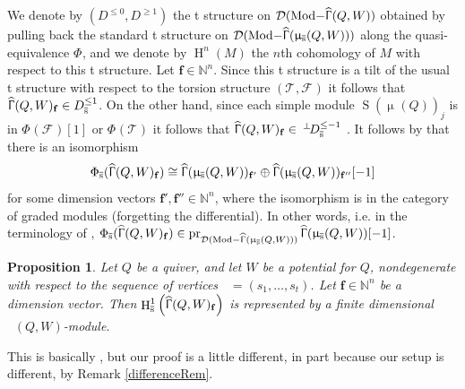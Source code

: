\documentclass[a4paper,10pt]{amsart}
\newtheorem{proposition}[theorem]{Proposition}
\newcommand{\ff}{\mathbf{f}}
\DeclareMathOperator{\Simp}{S}
\renewcommand{\Gamma}{\Upgamma}
\renewcommand{\mu}{\upmu}
\DeclareMathOperator{\Tmod}{Mod-}
\newcommand{\Rmod}[1]{\Tmod\!#1}
\DeclareMathOperator{\HJac}{\widehat{Jac}}
\DeclareMathOperator{\HGamma}{\widehat{\Gamma}}
\DeclareMathOperator{\Ss}{\overline{s}}
\DeclareMathOperator{\HO}{H}
\newcommand{\Dub}{\mathcal{D}}
\begin{document}
We denote by $(D_{\Ss}^{\leq 0},D_{\Ss}^{\geq 1})$ the t structure on $\Dub(\Rmod{\HGamma(Q,W)})$ obtained by pulling back the standard t structure on $\Dub(\Rmod{\HGamma(\mu_{\Ss}(Q,W))})$ along the quasi-equivalence $\Phi_{\Ss}$, and we denote by $\HO_{\Ss}^n(M)$ the $n$th cohomology of $M$ with respect to this t structure.  Let $\ff\in\mathbb{N}^n$.  Since this t structure is a tilt of the usual t structure with respect to the torsion structure $(\mathcal{T}_{\Ss},\mathcal{F}_{\Ss})$ it follows that $\HGamma(Q,W)_{\ff}\in D_{\Ss}^{\leq 1}$.  On the other hand, since each simple module $\Simp(\mu_{\Ss}(Q))_{j}$ is in $\Phi_{\Ss}(\mathcal{F}_{\Ss})[1]$ or $\Phi_{\Ss}(\mathcal{T}_{\Ss})$ it follows that $\HGamma(Q,W)_{\ff}\in \:^\perp \!D_{\Ss}^{\leq -1}$ .  It follows by \cite[Lem.2.11]{Pl11} that there is an isomorphism
\begin{equation}
\label{PlamIso}
\Phi_{\Ss}(\HGamma(Q,W)_{\ff})\cong\HGamma(\mu_{\Ss}(Q,W))_{\ff'}\oplus \HGamma(\mu_{\Ss}(Q,W))_{\ff''}[-1]
\end{equation}
for some dimension vectors $\ff',\ff''\in\mathbb{N}^n$, where the isomorphism is in the category of graded modules (forgetting the differential).  In other words, i.e. in the terminology of \cite{Pl11}, $\Phi_{\Ss}(\HGamma(Q,W)_{\ff})\in\textrm{pr}_{\Dub(\Rmod{\HGamma(\mu_{\Ss}(Q,W))})}\HGamma(\mu_{\Ss}(Q,W))[-1]$.
\begin{proposition}
Let $Q$ be a quiver, and let $W$ be a potential for $Q$, nondegenerate with respect to the sequence of vertices $\Ss=(s_1,\ldots,s_t)$.  Let $\ff\in\mathbb{N}^n$ be a dimension vector.  Then $\HO^1_{\Ss}\left(\HGamma(Q,W)_{\ff}\right)$ is represented by a finite dimensional $\HJac(Q,W)$-module.
\end{proposition}
This is basically \cite[Cor.4.11]{Efi11}, but our proof is a little different, in part because our setup is different, by Remark \ref{differenceRem}.
\end{document}
